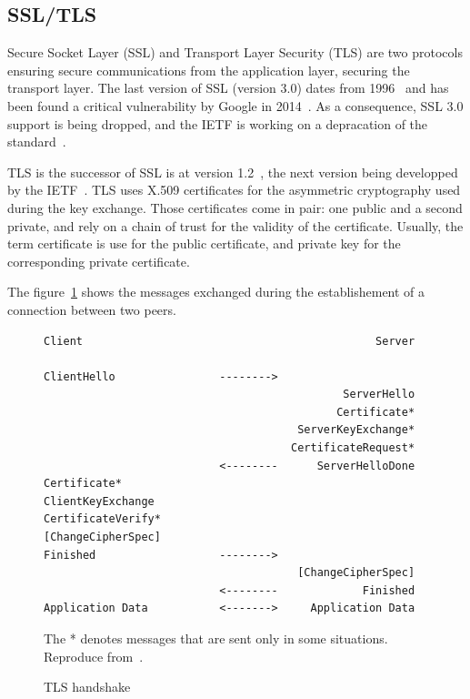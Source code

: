 \subsection{SSL/TLS}
Secure Socket Layer (SSL) and Transport Layer Security (TLS) are two protocols ensuring secure communications from the application layer, securing the transport layer.
The last version of SSL (version 3.0) dates from 1996~\cite{rfc6101} and has been found a critical vulnerability by Google in 2014~\cite{poodle}.
As a consequence, SSL 3.0 support is being dropped, and the IETF is working on a depracation of the standard~\cite{sslv3-diediedie-03}.

\noindent TLS is the successor of SSL is at version 1.2~\cite{rfc5246}, the next version being developped by the IETF~\cite{tls13-05}.
TLS uses X.509 certificates for the asymmetric cryptography used during the key exchange.
Those certificates come in pair: one public and a second private, and rely on a chain of trust for the validity of the certificate.
Usually, the term certificate is use for the public certificate, and private key for the corresponding private certificate.

\noindent The figure~\ref{fig:tls-handshake} shows the messages exchanged during the establishement of a connection between two peers.


\begin{figure}[ht]
\begin{verbatim}
Client                                             Server

ClientHello                -------->
                                              ServerHello
                                             Certificate*
                                       ServerKeyExchange*
                                      CertificateRequest*
                           <--------      ServerHelloDone
Certificate*
ClientKeyExchange
CertificateVerify*
[ChangeCipherSpec]
Finished                   -------->
                                       [ChangeCipherSpec]
                           <--------             Finished
Application Data           <------->     Application Data
\end{verbatim}
\caption{TLS handshake}{The * denotes messages that are sent only in some situations. Reproduce from~\cite{rfc5246}.}
\label{fig:tls-handshake}
\end{figure}

